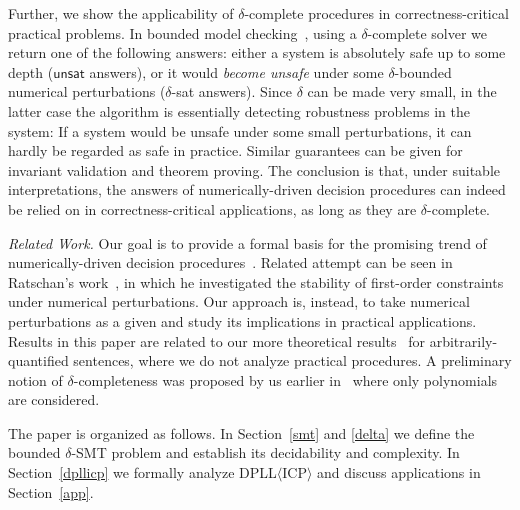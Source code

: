 \documentclass[prodmode]{acmsmall} %
\begin{document}

Further, we show the applicability of $\delta$-complete procedures in correctness-critical practical problems. In bounded model checking~\cite{DBLP:journals/fmsd/ClarkeBRZ01,DBLP:books/daglib/0007403}, using a $\delta$-complete solver we return one of the following answers: either a system is absolutely safe up to some depth ($\mathsf{unsat}$ answers), or it would {\em become unsafe} under some $\delta$-bounded numerical perturbations ($\delta$-{\sf sat} answers). Since $\delta$ can be made very small, in the latter case the algorithm is essentially detecting robustness problems in the system: If a system would be unsafe under some small perturbations, it can hardly be regarded as safe in practice. Similar guarantees can be given for invariant validation and theorem proving. The conclusion is that, under suitable interpretations, the answers of numerically-driven decision procedures can indeed be relied on in correctness-critical applications, as long as they are $\delta$-complete. 

{\em Related Work.} Our goal is to provide a formal basis for the promising trend of numerically-driven decision procedures~\cite{BorrallerasLNRR09,DBLP:conf/fmcad/NuzzoPSS10,HySAT,DBLP:conf/atva/EggersFH08,DBLP:conf/sefm/EggersRNF11,DBLP:conf/fmcad/Gao10,bern,cordic}.
Related attempt can be seen in Ratschan's work~\cite{DBLP:journals/jsc/Ratschan02}, in which he investigated the stability of first-order constraints under numerical perturbations. Our approach is, instead, to take numerical perturbations as a given and study its implications in practical applications. Results in this paper are related to our more theoretical results~\cite{gaoextended2} for arbitrarily-quantified sentences, where we do not analyze practical procedures. A preliminary notion of $\delta$-completeness was proposed by us earlier in~\cite{DBLP:conf/fmcad/Gao10} where only polynomials are considered.

The paper is organized as follows. In Section~\ref{smt} and \ref{delta} we define the bounded $\delta$-SMT problem and establish its decidability and complexity. In Section~\ref{dpllicp} we formally analyze DPLL$\langle$ICP$\rangle$ and discuss applications in Section~\ref{app}. 
\end{document}
